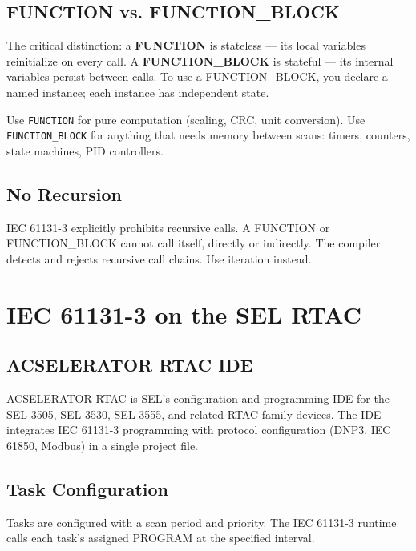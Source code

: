 \documentclass[12pt,twoside,openright]{memoir}
\begin{document}
\section{FUNCTION vs. FUNCTION\_BLOCK}

The critical distinction: a \textbf{FUNCTION} is stateless --- its local variables reinitialize on every call. A \textbf{FUNCTION\_BLOCK} is stateful --- its internal variables persist between calls. To use a FUNCTION\_BLOCK, you declare a named instance; each instance has independent state.

\begin{keyconcept}
Use \texttt{FUNCTION} for pure computation (scaling, CRC, unit conversion). Use \texttt{FUNCTION\_BLOCK} for anything that needs memory between scans: timers, counters, state machines, PID controllers.
\end{keyconcept}

\section{No Recursion}

IEC 61131-3 explicitly prohibits recursive calls. A FUNCTION or FUNCTION\_BLOCK cannot call itself, directly or indirectly. The compiler detects and rejects recursive call chains. Use iteration instead.

\chapter{IEC 61131-3 on the SEL RTAC}

\section{ACSELERATOR RTAC IDE}

ACSELERATOR RTAC is SEL's configuration and programming IDE for the SEL-3505, SEL-3530, SEL-3555, and related RTAC family devices. The IDE integrates IEC 61131-3 programming with protocol configuration (DNP3, IEC 61850, Modbus) in a single project file.

\section{Task Configuration}

Tasks are configured with a scan period and priority. The IEC 61131-3 runtime calls each task's assigned PROGRAM at the specified interval.
\end{document}
